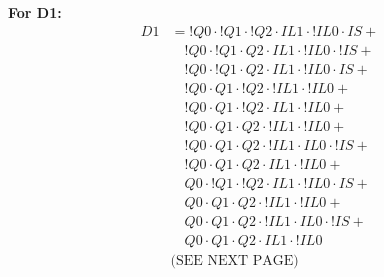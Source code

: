 \begin{multicols}{2}
    \textbf{For D1:}
    \begin{align*}
        D1 &=     !Q0 \cdot !Q1 \cdot !Q2 \cdot  IL1 \cdot !IL0 \cdot  IS + \\
           &\quad !Q0 \cdot !Q1 \cdot  Q2 \cdot  IL1 \cdot !IL0 \cdot !IS + \\
           &\quad !Q0 \cdot !Q1 \cdot  Q2 \cdot  IL1 \cdot !IL0 \cdot  IS + \\
           &\quad !Q0 \cdot  Q1 \cdot !Q2 \cdot !IL1 \cdot !IL0 + \\
           &\quad !Q0 \cdot  Q1 \cdot !Q2 \cdot  IL1 \cdot !IL0 + \\
           &\quad !Q0 \cdot  Q1 \cdot  Q2 \cdot !IL1 \cdot !IL0 + \\
           &\quad !Q0 \cdot  Q1 \cdot  Q2 \cdot !IL1 \cdot  IL0 \cdot !IS + \\
           &\quad !Q0 \cdot  Q1 \cdot  Q2 \cdot  IL1 \cdot !IL0 + \\
           &\quad  Q0 \cdot !Q1 \cdot !Q2 \cdot  IL1 \cdot !IL0 \cdot  IS + \\
           &\quad  Q0 \cdot  Q1 \cdot  Q2 \cdot !IL1 \cdot !IL0 + \\
           &\quad  Q0 \cdot  Q1 \cdot  Q2 \cdot !IL1 \cdot  IL0 \cdot !IS + \\
           &\quad  Q0 \cdot  Q1 \cdot  Q2 \cdot  IL1 \cdot !IL0 \\
           &\text{(SEE NEXT PAGE)}
    \end{align*}
\end{multicols}

\newpage


